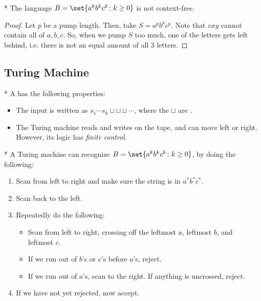 \begin{cor}*
	The language $B = \set{a^kb^kc^k\colon k\geq 0}$ is not context-free.
\end{cor}

\begin{proof}
	Let $p$ be a pump length. Then, take $S = a^pb^pc^p$.
	Note that $vxy$ cannot contain all of $a,b,c$. So, when we pump $S$ too much, one of the letters gets left behind, i.e. there is not an equal amount of all $3$ letters.
\end{proof}

\subsection{Turing Machine}

\begin{defn}*
	A  has the following properties:
	\begin{itemize}
		\item The input is written as $s_1\cdots s_k \sqcup \sqcup \sqcup \cdots$, where the $\sqcup$ are .
		\item The Turing machine reads and writes on the tape, and can move left or right. However, its logic has \emph{finite control}.
	\end{itemize}
\end{defn}

\begin{exm}*
	A Turing machine can recognize $B = \set{a^kb^kc^k\colon k\geq 0}$, by doing the following:
	\begin{enumerate}
		\item Scan from left to right and make sure the string is in $a^*b^*c^*$.
		\item Scan back to the left.
		\item Repeatedly do the following:
			\begin{itemize}
				\item Scan from left to right, crossing off the leftmost $a$, leftmost $b$, and leftmost $c$.
				\item If we run out of $b$'s or $c$'s before $a$'s, reject.
				\item If we run out of $a$'s, scan to the right. If anything is uncrossed, reject.
			\end{itemize}
		\item If we have not yet rejected, now accept.
	\end{enumerate}
\end{exm}


